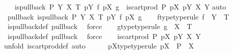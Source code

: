 \begin{isabellebody}
\ \ \ {\isachardoublequoteopen}{\isacharparenleft}{\kern0pt}is{\isacharunderscore}{\kern0pt}pullback\ P\ Y\ X\ T\ {\isacharparenleft}{\kern0pt}pY{\isacharparenright}{\kern0pt}\ f\ {\isacharparenleft}{\kern0pt}pX{\isacharparenright}{\kern0pt}\ g{\isacharparenright}{\kern0pt}\ {\isacharequal}{\kern0pt}\ {\isacharparenleft}{\kern0pt}is{\isacharunderscore}{\kern0pt}cart{\isacharunderscore}{\kern0pt}prod\ P\ pX\ pY\ X\ Y{\isacharparenright}{\kern0pt}{\isachardoublequoteclose}\isanewline
%
\isadelimproof
%
\endisadelimproof
%
\isatagproof
{}\isamarkupfalse%
{\isacharparenleft}{\kern0pt}auto{\isacharparenright}{\kern0pt}\isanewline
\ \ \isamarkupfalse%
\ pullback{\isacharcolon}{\kern0pt}\ {\isachardoublequoteopen}is{\isacharunderscore}{\kern0pt}pullback\ P\ Y\ X\ T\ pY\ f\ pX\ g{\isachardoublequoteclose}\isanewline
\ \ \isamarkupfalse%
\ f{\isacharunderscore}{\kern0pt}type{\isacharbrackleft}{\kern0pt}type{\isacharunderscore}{\kern0pt}rule{\isacharbrackright}{\kern0pt}{\isacharcolon}{\kern0pt}\ {\isachardoublequoteopen}f\ {\isacharcolon}{\kern0pt}\ Y\ {\isasymrightarrow}\ T{\isachardoublequoteclose}\isanewline
\ \ \ \ \isamarkupfalse%
\ is{\isacharunderscore}{\kern0pt}pullback{\isacharunderscore}{\kern0pt}def\ pullback\ \isamarkupfalse%
\ force\isanewline
\ \ \isamarkupfalse%
\ g{\isacharunderscore}{\kern0pt}type{\isacharbrackleft}{\kern0pt}type{\isacharunderscore}{\kern0pt}rule{\isacharbrackright}{\kern0pt}{\isacharcolon}{\kern0pt}\ {\isachardoublequoteopen}g\ {\isacharcolon}{\kern0pt}\ X\ {\isasymrightarrow}\ T{\isachardoublequoteclose}\isanewline
\ \ \ \ \isamarkupfalse%
\ is{\isacharunderscore}{\kern0pt}pullback{\isacharunderscore}{\kern0pt}def\ pullback\ \isamarkupfalse%
\ force\isanewline
\ \ \isamarkupfalse%
\ {\isachardoublequoteopen}is{\isacharunderscore}{\kern0pt}cart{\isacharunderscore}{\kern0pt}prod\ P\ pX\ pY\ X\ Y{\isachardoublequoteclose}\isanewline
\ \ \isamarkupfalse%
{\isacharparenleft}{\kern0pt}unfold\ is{\isacharunderscore}{\kern0pt}cart{\isacharunderscore}{\kern0pt}prod{\isacharunderscore}{\kern0pt}def{\isacharcomma}{\kern0pt}\ auto{\isacharparenright}{\kern0pt}\isanewline
\ \ \ \ \isamarkupfalse%
\ pX{\isacharunderscore}{\kern0pt}type{\isacharbrackleft}{\kern0pt}type{\isacharunderscore}{\kern0pt}rule{\isacharbrackright}{\kern0pt}{\isacharcolon}{\kern0pt}\ {\isachardoublequoteopen}pX\ {\isacharcolon}{\kern0pt}\ P\ {\isasymrightarrow}\ X{\isachardoublequoteclose}\isanewline

\end{isabellebody}
